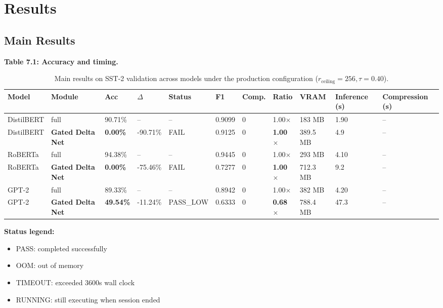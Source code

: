 
\section{Results}

\subsection{Main Results}

\textbf{Table 7.1: Accuracy and timing.}

\begin{table}[t]
\centering
\small
\begin{tabular}{lllllllllll}
\toprule
\textbf{Model} & \textbf{Module} & \textbf{Acc} & \textbf{$\Delta$} & \textbf{Status} & \textbf{F1} & \textbf{Comp.} & \textbf{Ratio} & \textbf{VRAM} & \textbf{Inference (s)} & \textbf{Compression (s)} \\
\midrule
DistilBERT & full & 90.71\% & -- & -- & 0.9099 & 0 & 1.00$\times$ & 183 MB & 1.90 & -- \\
DistilBERT & \textbf{Gated Delta Net} & \textbf{0.00\%} & -90.71\% & FAIL & 0.9125 & 0 & \textbf{1.00$\times$} & 389.5 MB & 4.9 & -- \\
RoBERTa & full & 94.38\% & -- & -- & 0.9445 & 0 & 1.00$\times$ & 293 MB & 4.10 & -- \\
RoBERTa & \textbf{Gated Delta Net} & \textbf{0.00\%} & -75.46\% & FAIL & 0.7277 & 0 & \textbf{1.00$\times$} & 712.3 MB & 9.2 & -- \\
GPT-2 & full & 89.33\% & -- & -- & 0.8942 & 0 & 1.00$\times$ & 382 MB & 4.20 & -- \\
GPT-2 & \textbf{Gated Delta Net} & \textbf{49.54\%} & -11.24\% & PASS_LOW & 0.6333 & 0 & \textbf{0.68$\times$} & 788.4 MB & 47.3 & -- \\
\bottomrule
\end{tabular}
\caption{Main results on SST-2 validation across models under the production configuration ($r_{\mathrm{ceiling}}=256, \tau=0.40$).}
\label{tab:main_sst2}
\end{table}

\textbf{Status legend:}
\begin{itemize}
\item PASS: completed successfully
\item OOM: out of memory
\item TIMEOUT: exceeded 3600s wall clock
\item RUNNING: still executing when session ended

\end{itemize}
